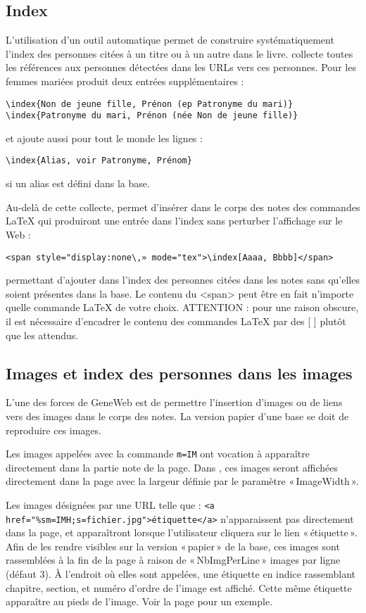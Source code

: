 \subsection{Index}

L'utilisation d'un outil automatique permet de construire systématiquement
l'index des personnes citées à un titre ou à un autre dans le livre.
\gwtol{} collecte toutes les références aux personnes
détectées dans les URLs vers ces personnes. Pour les femmes mariées
\gwtol{} produit deux entrées supplémentaires :
\begin{verbatim}
\index{Non de jeune fille, Prénon (ep Patronyme du mari)}
\index{Patronyme du mari, Prénon (née Non de jeune fille)}
\end{verbatim}
et ajoute aussi pour tout le monde les lignes :
\begin{verbatim}
\index{Alias, voir Patronyme, Prénom}
\end{verbatim}
si un alias est défini dans la base.

Au-delà de cette collecte, \gwtol{} permet d'insérer dans le corps des notes
des commandes \LaTeX{} qui produiront une entrée dans l'index sans perturber
l'affichage sur le Web :
\begin{verbatim}
<span style="display:none\,» mode="tex">\index[Aaaa, Bbbb]</span>
\end{verbatim}
permettant d'ajouter dans l'index des personnes citées dans les notes
sans qu'elles soient présentes dans la base.
Le contenu du <span> peut être en fait n'importe quelle commande LaTeX de votre choix.
ATTENTION : pour une raison obscure, il est nécessaire d'encadrer le
contenu des commandes \LaTeX{} par des [ ] plutôt que les { } attendus.

\subsection{Images et index des personnes dans les images}

L'une des forces de GeneWeb est de permettre l'insertion d'images ou de
liens vers des images dans le corps des notes. La version papier d'une base
se doit de reproduire ces images.

Les images appelées avec la commande \verb|m=IM| ont vocation à apparaître
directement dans la partie note de la page. Dans \gwtol{}, ces images seront
affichées directement dans la page avec la largeur définie par
le paramètre «\,ImageWidth\,».

Les images désignées par une URL telle que :
\verb|<a href="%sm=IMH;s=fichier.jpg">étiquette</a>| n'apparaissent pas
directement dans la page, et apparaîtront lorsque l'utilisateur cliquera
sur le lien «\,étiquette\,». Afin de les rendre visibles sur la
version «\,papier\,» de la base, ces images sont rassemblées à la fin
de la page à raison de «\,NbImgPerLine\,» images par ligne (défaut 3).
À l'endroit où elles sont appelées, une étiquette en indice rassemblant
chapitre, section, et numéro d'ordre de l'image est affiché. Cette même 
étiquette apparaître au pieds de l'image.
Voir la page \pageref{leondupont} pour un exemple.

